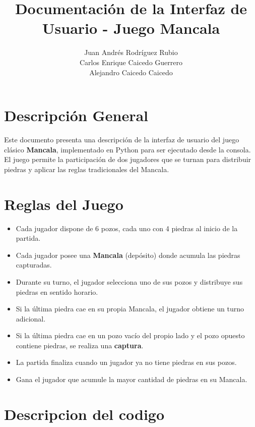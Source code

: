 \documentclass[12pt]{article}
\title{Documentación de la Interfaz de Usuario - Juego Mancala}
\author{
  Juan Andrés Rodríguez Rubio \\
  Carlos Enrique Caicedo Guerrero \\
  Alejandro Caicedo Caicedo
}
\date{}
\begin{document}
\maketitle

\section{Descripción General}

Este documento presenta una descripción de la interfaz de usuario del juego clásico \textbf{Mancala}, implementado en Python para ser ejecutado desde la consola. El juego permite la participación de dos jugadores que se turnan para distribuir piedras y aplicar las reglas tradicionales del Mancala.

\section{Reglas del Juego}

\begin{itemize}
    \item Cada jugador dispone de 6 pozos, cada uno con 4 piedras al inicio de la partida.
    \item Cada jugador posee una \textbf{Mancala} (depósito) donde acumula las piedras capturadas.
    \item Durante su turno, el jugador selecciona uno de sus pozos y distribuye sus piedras en sentido horario.
    \item Si la última piedra cae en su propia Mancala, el jugador obtiene un turno adicional.
    \item Si la última piedra cae en un pozo vacío del propio lado y el pozo opuesto contiene piedras, se realiza una \textbf{captura}.
    \item La partida finaliza cuando un jugador ya no tiene piedras en sus pozos.
    \item Gana el jugador que acumule la mayor cantidad de piedras en su Mancala.
\end{itemize}
\section{Descripcion del codigo}
\end{document}
